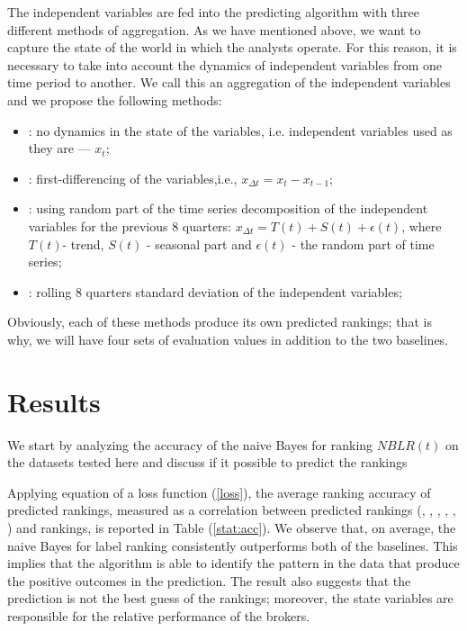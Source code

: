 The independent variables are fed into the predicting algorithm with three different methods of aggregation. As we have mentioned above, we want to capture the state of the world in which the analysts operate. For this reason, it is necessary to take into account the dynamics of independent variables from one time period to another. We call this an aggregation of the independent variables and we propose the following methods:
\singlespace
\begin{itemize}
\item \raw: no dynamics in the state of the  variables, i.e. independent variables used as they are --- $x_t$;
\item  \diff: first-differencing  of the variables,i.e., $x_{\Delta{t}}=x_t-x_{t-1}$;
\item  \random: using random part of the time series decomposition of the independent variables for the previous 8 quarters: $x_{\Delta{t}}=T(t)+S(t)+\epsilon (t)$, where $T(t)$- trend, $S(t)$ - seasonal part and $\epsilon (t)$ - the random part of time series; 
\item  \rollsd: rolling 8 quarters standard deviation of the independent variables;
\end{itemize}
\doublespace
Obviously, each of these methods produce its own predicted rankings; that is why, we will have four sets of evaluation values in addition to the two baselines.





\section{Results}
\label{sec:results}

%

We start by analyzing the accuracy of the naive Bayes for ranking  $NBLR(t)$ on  the datasets tested here and discuss if it possible to predict the rankings

Applying equation of a loss function (\ref{loss}), the average ranking accuracy of  predicted rankings, measured as a correlation between predicted rankings (\raw{}, \diff{}, \random{}, \rollsd{}, , \naive{}) and \tr{} rankings,  is reported in Table (\ref{stat:acc}). We observe that, on average, the naive Bayes for label ranking consistently outperforms both of the baselines. This implies that the algorithm is able to identify the pattern in the data that produce the positive outcomes in the prediction. The result also suggests that the \naive{} prediction is not the best guess of the rankings;  moreover,  the state variables are responsible for the relative performance of the brokers. 

